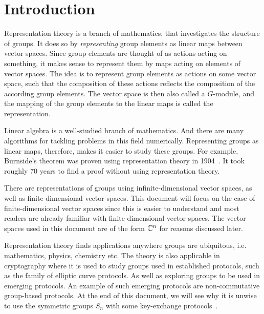 \section{Introduction}

Representation theory is a branch of mathematics, that investigates the structure of groups.
It does so by \textit{representing} group elements as linear maps between vector spaces.
Since group elements are thought of as actions acting on something, it makes sense to represent them by maps acting on elements of vector spaces.
The idea is to represent group elements as actions on some vector space, such that the composition of these actions reflects the composition of the according group elements.
The vector space is then also called a $G$-module, and the mapping of the group elements to the linear maps is called the representation.

Linear algebra is a well-studied branch of mathematics.
And there are many algorithms for tackling problems in this field numerically.
Representing groups as linear maps, therefore, makes it easier to study these groups.
For example, Burnside's theorem was proven using representation theory in 1904~\cite{burnside1904groups}.
It took roughly 70 years to find a proof without using representation theory.

There are representations of groups using infinite-dimensional vector spaces, as well as finite-dimensional vector spaces.
This document will focus on the case of finite-dimensional vector spaces since this is easier to understand and most readers are already familiar with finite-dimensional vector spaces.
The vector spaces used in this document are of the form $\mathbb{C}^n$ for reasons discussed later.

Representation theory finds applications anywhere groups are ubiquitous, i.e. mathematics, physics, chemistry etc.
The theory is also applicable in cryptography where it is used to study groups used in established protocols, such as the family of elliptic curve protocols.
As well as exploring groups to be used in emerging protocols.
An example of such emerging protocols are non-commutative group-based protocols.
At the end of this document, we will see why it is unwise to use the symmetric groups $S_n$ with some key-exchange protocols~\cite{khovanov2022monoidal}.
